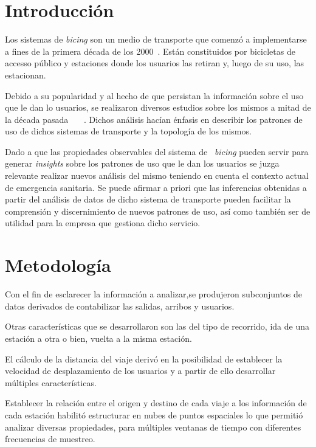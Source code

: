 \documentclass[runningheads,a4paper,spanish]{llncs}
\begin{document}
\section{Introducción}

Los sistemas de \textit{bicing} son un medio de transporte que comenzó a implementarse a
fines de la primera década de los 2000~\cite{demaio2009bike}. Están
constituidos por bicicletas de accesso público y estaciones donde los usuarios
las retiran y, luego de su uso, las estacionan.

Debido a su popularidad y al hecho de que persistan la información sobre el uso
que le dan lo usuarios, se realizaron diversos estudios sobre los mismos a
mitad de la década pasada~\cite{OBrien2014}~\cite{jensen2010characterizing}
~\cite{lathia2012measuring}. Dichos análisis hacían énfasis en describir los
patrones de uso de dichos sistemas de transporte y la topología de los mismos. 

Dado a que las propiedades observables del sistema de ~\textit{bicing} pueden
servir para generar \textit{insights} sobre los patrones de uso que le dan los
usuarios se juzga relevante realizar nuevos análisis del mismo teniendo en
cuenta el contexto actual de emergencia sanitaria. Se puede afirmar a priori
que las inferencias obtenidas a partir del análisis de datos de dicho sistema
de transporte pueden facilitar la comprensión y discernimiento de nuevos
patrones de uso, así como también ser de utilidad para la empresa que gestiona
dicho servicio.

\section{Metodología}

Con el fin de esclarecer la información a analizar,se produjeron subconjuntos de
datos derivados de contabilizar las salidas, arribos y usuarios.  

Otras características que se desarrollaron son las del tipo de recorrido, ida
de una estación a otra o bien, vuelta a la misma estación. 

El cálculo de la distancia del viaje derivó en la posibilidad de establecer la
velocidad de desplazamiento de los usuarios y a partir de ello desarrollar
múltiples características.

Establecer la relación entre el origen y destino de cada viaje a los
información de cada estación habilitó estructurar en nubes de puntos espaciales
lo que permitió analizar diversas propiedades, para múltiples ventanas de
tiempo con diferentes frecuencias de muestreo.  
\end{document}
